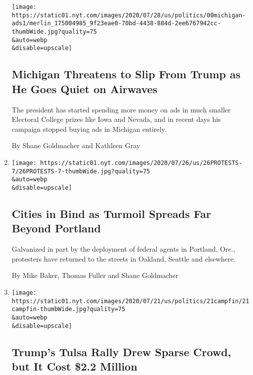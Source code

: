 \begin{enumerate}
  \texttt{[image: https://static01.nyt.com/images/2020/07/28/us/politics/00michigan-ads1/merlin\_175004985\_9f23eae0-70bd-4438-884d-2ee6767942cc-thumbWide.jpg?quality=75\\\&auto=webp\\\&disable=upscale]}

  \hypertarget{michigan-threatens-to-slip-from-trump-as-he-goes-quiet-on-airwaves}{%
  \subsection{Michigan Threatens to Slip From Trump as He Goes Quiet on
  Airwaves}\label{michigan-threatens-to-slip-from-trump-as-he-goes-quiet-on-airwaves}}

  The president has started spending more money on ads in much smaller
  Electoral College prizes like Iowa and Nevada, and in recent days his
  campaign stopped buying ads in Michigan entirely.

  By Shane Goldmacher and Kathleen Gray
\item
  \href{/2020/07/26/us/protests-portland-seattle-trump.html}{}

  \texttt{[image: https://static01.nyt.com/images/2020/07/26/us/26PROTESTS-7/26PROTESTS-7-thumbWide.jpg?quality=75\\\&auto=webp\\\&disable=upscale]}

  \hypertarget{cities-in-bind-as-turmoil-spreads-far-beyond-portland}{%
  \subsection{Cities in Bind as Turmoil Spreads Far Beyond
  Portland}\label{cities-in-bind-as-turmoil-spreads-far-beyond-portland}}

  Galvanized in part by the deployment of federal agents in Portland,
  Ore., protesters have returned to the streets in Oakland, Seattle and
  elsewhere.

  By Mike Baker, Thomas Fuller and Shane Goldmacher
\item
  \href{/2020/07/21/us/politics/trump-tulsa-rally-cost.html}{}

  \texttt{[image: https://static01.nyt.com/images/2020/07/21/us/politics/21campfin/21campfin-thumbWide.jpg?quality=75\\\&auto=webp\\\&disable=upscale]}

  \hypertarget{trumps-tulsa-rally-drew-sparse-crowd-but-it-cost-22-million}{%
  \subsection{Trump's Tulsa Rally Drew Sparse Crowd, but It Cost \$2.2
  Million}\label{trumps-tulsa-rally-drew-sparse-crowd-but-it-cost-22-million}}


\end{enumerate}

